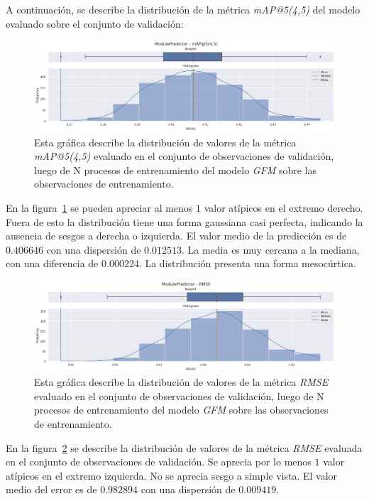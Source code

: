 \documentclass[11pt,a4paper,twoside]{thesis}
\begin{document}
\clearpage

A continuación, se describe la distribución de la métrica \textit{mAP@5(4,5)}
del modelo evaluado sobre el conjunto de validación:

\begin{figure}[h!]
	\centering
	\includegraphics[width=15cm]{./images/metrics-GFM-mapk.png}
	\caption{
		Esta gráfica describe la distribución de valores de la
		métrica \textit{mAP@5(4,5)} evaluado en el conjunto de observaciones
		de validación, luego de N procesos de entrenamiento del modelo
		\textit{GFM} sobre las observaciones de entrenamiento.
	}
	\label{fig:gmfMAP}
\end{figure}

En la figura~\ref{fig:gmfMAP} se pueden apreciar al menos $1$ valor atípicos en
el extremo derecho. Fuera de esto la distribución tiene una forma gaussiana
casi perfecta, indicando la ausencia de sesgos a derecha o izquierda. El valor
medio de la predicción es de $0.406646$ con una dispersión de $0.012513$. La
media es muy cercana a la mediana, con una diferencia de $0.000224$. La
distribución presenta una forma mesocúrtica.

\begin{figure}[h!]
	\centering
	\includegraphics[width=15cm]{./images/metrics-GFM-RMSE.png}
	\caption{
		Esta gráfica describe la distribución de valores de la métrica
		\textit{RMSE} evaluado en el conjunto de observaciones de validación,
		luego de N procesos de entrenamiento del modelo \textit{GFM} sobre
		las observaciones de entrenamiento.
	}
	\label{fig:gmfRMSE}
\end{figure}

En la figura~\ref{fig:gmfRMSE} se describe la distribución de valores de la
métrica \textit{RMSE} evaluada en el conjunto de observaciones de validación.
Se aprecia por lo menos $1$ valor atípicos en el extremo izquierda. No se
aprecia sesgo a simple vista. El valor medio del error es de $ 0.982894$ con
una dispersión de $0.009419$.
\end{document}
